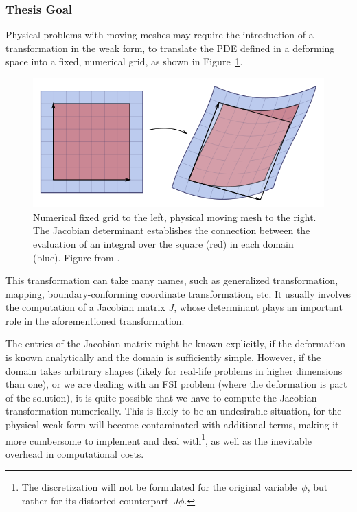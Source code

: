 \documentclass[thesis.tex]{subfiles}
\begin{document}
\subsubsection{Thesis Goal}
Physical problems with moving meshes may require 
the introduction of a transformation in the weak form,
to translate the PDE defined in a deforming space into a fixed, 
numerical grid, as shown in Figure~\ref{fig:jacobianTransformation}.
\begin{figure}[h]
    \includegraphics[width=\columnwidth]{research_project/piston/figures/Jacobian_determinant_and_distortion.png}
    \caption{Numerical fixed grid to the left, physical moving mesh to the right.
    The Jacobian determinant establishes the connection between 
    the evaluation of an integral over the square (red) in each domain (blue).
    Figure from \cite{jacobianTransformation}.}
    \label{fig:jacobianTransformation}
\end{figure}

This transformation can take many names, 
such as generalized transformation, 
mapping,
boundary-conforming coordinate transformation,
etc.
It usually involves the computation of a Jacobian matrix $J$,
whose determinant plays an important role in the aforementioned transformation.

The entries of the Jacobian matrix might be known explicitly,
if the deformation is known analytically and the domain is sufficiently simple.
However, if the domain takes arbitrary shapes 
(likely for real-life problems in higher dimensions than one),
or we are dealing with an FSI problem (where the deformation is part of the solution),
it is quite possible that we have to compute the Jacobian transformation numerically.
This is likely to be an undesirable situation, 
for the physical weak form will become contaminated with additional terms, 
making it more cumbersome to implement and deal with\footnote{
    The discretization will not be formulated for the original variable~$\phi$,
    but rather for its distorted counterpart~$J \phi$.
    },
as well as the inevitable overhead in computational costs.
\end{document}
